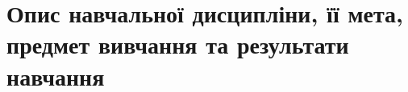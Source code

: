 \documentclass{Syllabus}
\begin{document}
\printhead


\bluetableprint


\section{Опис навчальної дисципліни, її мета, предмет вивчання та результати навчання}


%

%
\end{document}
